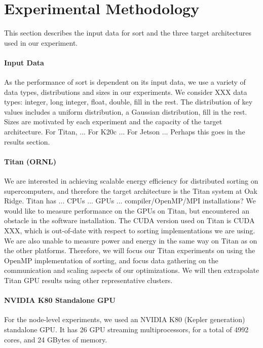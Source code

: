 \section{Experimental Methodology}

This section describes the input data for sort and the
three target architectures used in our experiment.

\paragraph{Input Data}
As the performance of sort is dependent on its input data, we 
use a variety of data types, distributions and sizes in our experiments.
We consider XXX data types: 
integer, long integer, float, double, {\color{red} fill in
the rest.}
The distribution of key values 
includes a uniform distribution, a Gaussian distribution, 
{\color{red} fill in
the rest.}
Sizes are motivated by each experiment and the capacity of the
target architecture.  {\color{red} For Titan, ...  
For K20c ... For Jetson ...  Perhaps this goes in the results section.}

\paragraph{Titan (ORNL)} 
We are interested in 
achieving scalable energy efficiency for distributed
sorting on supercomputers, and therefore the target architecture is the
Titan system at Oak Ridge.  Titan has 
{\color{red}... CPUs ... GPUs ...  compiler/OpenMP/MPI installations?}
We would like to measure performance on the GPUs on Titan, but encountered
an obstacle in the software installation.  
The CUDA version used on Titan is CUDA XXX, which is out-of-date with respect to
sorting implementations we are using.  We are also unable to measure
power and energy in the same way on Titan as on the other platforms.
Therefore, we will focus our
Titan experiments on using the OpenMP implementation of sorting, and focus
data gathering on the communication and scaling aspects of our optimizations.
We will then extrapolate
Titan GPU results using other representative clusters.


\paragraph{NVIDIA K80 Standalone GPU}
For the node-level experiments, we used an NVIDIA K80 (Kepler 
generation) standalone GPU.
It has 26 GPU streaming multiprocessors, for a total of 4992 cores, 
and 24 GBytes of memory.


